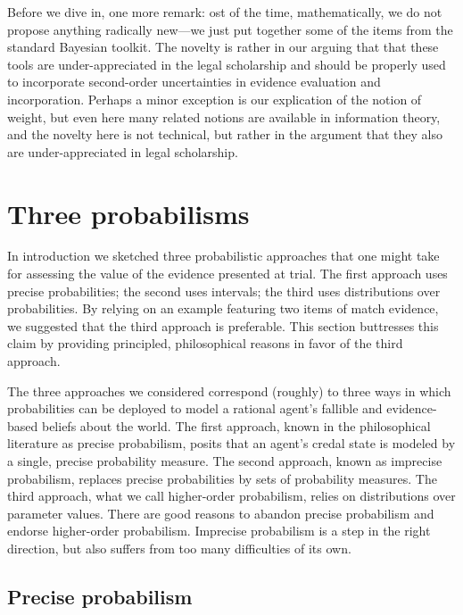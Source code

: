 \documentclass[
  10pt,
  dvipsnames,enabledeprecatedfontcommands]{scrartcl}
\begin{document}
Before we dive in, one more remark: ost of the time, mathematically, we
do not propose anything radically new---we just put together some of the
items from the standard Bayesian toolkit. The novelty is rather in our
arguing that that these tools are under-appreciated in the legal
scholarship and should be properly used to incorporate second-order
uncertainties in evidence evaluation and incorporation. Perhaps a minor
exception is our explication of the notion of weight, but even here many
related notions are available in information theory, and the novelty
here is not technical, but rather in the argument that they also are
under-appreciated in legal scholarship.

\hypertarget{three-probabilisms}{%
\section{Three probabilisms}\label{three-probabilisms}}

\label{sec:three-probabilism}

In introduction we sketched three probabilistic approaches that one
might take for assessing the value of the evidence presented at trial.
The first approach uses precise probabilities; the second uses
intervals; the third uses distributions over probabilities. By relying
on an example featuring two items of match evidence, we suggested that
the third approach is preferable. This section buttresses this claim by
providing principled, philosophical reasons in favor of the third
approach.

The three approaches we considered correspond (roughly) to three ways in
which probabilities can be deployed to model a rational agent's fallible
and evidence-based beliefs about the world. The first approach, known in
the philosophical literature as precise probabilism, posits that an
agent's credal state is modeled by a single, precise probability
measure. The second approach, known as imprecise probabilism, replaces
precise probabilities by sets of probability measures. The third
approach, what we call higher-order probabilism, relies on distributions
over parameter values. There are good reasons to abandon precise
probabilism and endorse higher-order probabilism. Imprecise probabilism
is a step in the right direction, but also suffers from too many
difficulties of its own.

\hypertarget{precise-probabilism}{%
\subsection{Precise probabilism}\label{precise-probabilism}}
\end{document}
